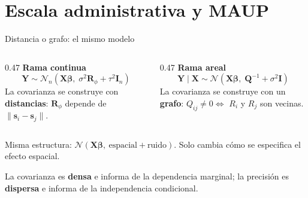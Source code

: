 \documentclass[11pt,aspectratio=169]{beamer}
\newcommand{\loci}[1]{\bm{s}_{#1}}           %
\newcommand{\varesp}{\sigma^{2}}             %
\newcommand{\pepita}{\tau^{2}}               %
\newcommand{\escala}{\phi}                   %
\newcommand{\Rphi}{\bm{R}_{\escala}}         %
\newcommand{\Prec}{\bm{Q}}                   %
\newcommand{\Normal}{\mathcal{N}}
\begin{document}
\section{Escala administrativa y MAUP}

\begin{frame}{Distancia o grafo: el mismo modelo}

\vspace{2mm}
\begin{columns}[T]
\begin{column}{0.47\textwidth}
\centering
\textbf{Rama continua}
\[ \bm{Y} \sim \Normal_n\!\left(\bm{X}\bm{\beta},\;
   \varesp\Rphi + \pepita\bm{I}_n\right) \]
\vspace{1mm}
{\small La covarianza se construye con \textbf{distancias}: $\Rphi$ depende de
$\lVert\loci{i}-\loci{j}\rVert$.}
\end{column}
\begin{column}{0.47\textwidth}
\centering
\textbf{Rama areal}
\[ \bm{Y}\mid\bm{X} \sim \Normal\!\left(\bm{X}\bm{\beta},\;
   \Prec^{-1} + \varesp\bm{I}\right) \]
\vspace{1mm}
{\small La covarianza se construye con un \textbf{grafo}:
$Q_{ij}\neq 0 \iff$ $R_i$ y $R_j$ son vecinas.}
\end{column}
\end{columns}

\vspace{4mm}
\begin{block}{}
\centering
\small
Misma estructura: $\Normal(\bm{X}\bm{\beta},\ \text{espacial}+\text{ruido})$.
Solo cambia cómo se especifica el efecto espacial.

\vspace{1.5mm}
La covarianza es \textbf{densa} e informa de la dependencia marginal; la
precisión es \textbf{dispersa} e informa de la independencia condicional.
\end{block}

\vspace{2mm}

\end{frame}
\end{document}
